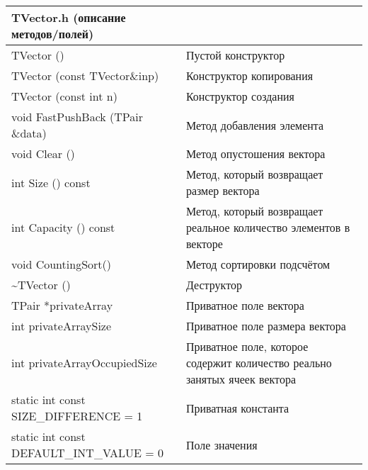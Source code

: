 \documentclass[pdf, unicode, 12pt, a4paper,oneside,fleqn]{article}
\begin{document}
\newpage
\begin{longtable}{|p{8.4cm}|p{7.52cm}|}
\hline
\rowcolor{lightgray}
\multicolumn{2}{|c|} {TVector.h (описание методов/полей)}\\
\hline 
TVector ()&Пустой конструктор\\
TVector (const TVector\&inp)&Конструктор копирования\\
TVector (const int n)&Конструктор создания\\
\hline
\hline
void FastPushBack (TPair \&data)&Метод добавления элемента\\
\hline
\hline
void Clear ()&Метод опустошения вектора\\
\hline
\hline
int Size () const&Метод, который возвращает размер вектора\\
\hline
\hline
int Capacity () const&Метод, который возвращает реальное количество элементов в векторе\\
\hline
\hline
void CountingSort()&Метод сортировки подсчётом\\
\hline
\hline
\textasciitilde TVector ()&Деструктор\\
\hline
\hline
TPair *privateArray&Приватное поле вектора\\
\hline
\hline
int privateArraySize&Приватное поле размера вектора\\
\hline
\hline
int privateArrayOccupiedSize&Приватное поле, которое содержит количество реально занятых ячеек вектора\\
\hline
\hline
static int const SIZE\_DIFFERENCE = 1&Приватная константа\\
\hline
\hline
static int const DEFAULT\_INT\_VALUE = 0&Поле значения\\
\hline
\end{longtable}
\newpage
\end{document}
